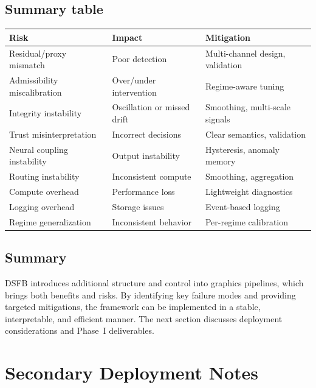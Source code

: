 \documentclass[11pt]{article}
\theoremstyle{definition}
\theoremstyle{plain}
\begin{document}
\subsection{Summary table}

\begin{center}
\begin{tabular}{p{4cm} p{5cm} p{5cm}}
\toprule
Risk & Impact & Mitigation \\
\midrule
Residual/proxy mismatch & Poor detection & Multi-channel design, validation \\
Admissibility miscalibration & Over/under intervention & Regime-aware tuning \\
Integrity instability & Oscillation or missed drift & Smoothing, multi-scale signals \\
Trust misinterpretation & Incorrect decisions & Clear semantics, validation \\
Neural coupling instability & Output instability & Hysteresis, anomaly memory \\
Routing instability & Inconsistent compute & Smoothing, aggregation \\
Compute overhead & Performance loss & Lightweight diagnostics \\
Logging overhead & Storage issues & Event-based logging \\
Regime generalization & Inconsistent behavior & Per-regime calibration \\
\bottomrule
\end{tabular}
\end{center}


\subsection{Summary}

DSFB introduces additional structure and control into graphics pipelines, which brings both benefits and risks. By identifying key failure modes and providing targeted mitigations, the framework can be implemented in a stable, interpretable, and efficient manner. The next section discusses deployment considerations and Phase~I deliverables.


\section{Secondary Deployment Notes}
\label{sec:deployment}
\end{document}
